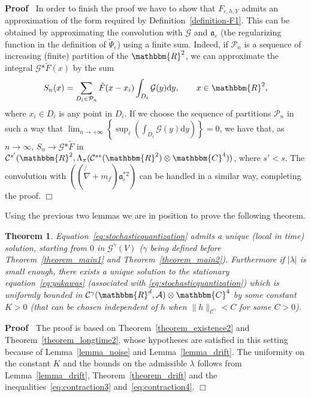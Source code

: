 \documentclass[11pt]{article}
\newcommand{\asterisk}{\mathord{*}}
\newcommand{\mathd}{\mathrm{d}}
\newenvironment{proof}{\noindent\textbf{Proof\ }}{\hspace*{\fill}$\Box$\medskip}
\newtheorem{theorem}{Theorem}
\begin{document}
\begin{proof}
  In order to finish the proof we have to show that $F_{\varepsilon, h, Y}$
  admits an approximation of the form required by
  Definition~\ref{definition-F1}. This can be obtained by approximating the
  convolution with $\mathcal{G}$ and $\mathfrak{a}_{\varepsilon}$ (the
  regularizing function in the definition of $\tilde{\Psi}_{\varepsilon}$)
  using a finite sum. Indeed, if $\mathcal{P}_n$ is a sequence of increasing
  (finite) partition of the $\mathbbm{R}^2$, we can approximate the integral
  $\mathcal{G} \asterisk \tilde{F} (x)$ by the sum
  \[ S_n (x) = \sum_{D_i \in \mathcal{P}_n}  \tilde{F} (x - x_i) \int_{D_i}
     \mathcal{G} (y) \mathd y, \qquad x \in \mathbbm{R}^2, \]
  where $x_i \in D_i$ is any point in $D_i$. If we choose the sequence of
  partitions $\mathcal{P}_n$ in such a way that $\lim_{n \rightarrow + \infty}
  \left\{ \sup_i \left( \int_{D_i} \mathcal{G} (y) \mathd y \right) \right\} =
  0$, we have that, as $n \rightarrow \infty$, $S_n \rightarrow \mathcal{G}
  \asterisk \tilde{F}$ in $\mathcal{C}^{s'} (\mathbbm{R}^2, \Lambda_{\pi}
  (\mathcal{C}^{s \ast} (\mathbbm{R}^2) \otimes \mathbbm{C}^4))$, where $s' <
  s$. The convolution with $\left( \left( \not{\nabla} + m_f \right)
  \mathfrak{a}_{\varepsilon}^{\asterisk 2} \right)$ can be handled in a
  similar way, completing the proof.
\end{proof}

Using the previous two lemmas we are in position to prove the following
theorem.

\begin{theorem}
  \label{theorem_main3}Equation~{\eqref{eq:stochasticquantization}} admits a
  unique (local in time) solution, starting from $0$ in $\mathcal{G}^{\gamma}
  (V)$ ($\gamma$ being defined before Theorem~\ref{theorem_main1} and
  Theorem~\ref{theorem_main2}). Furthermore if $| \lambda |$ is small enough,
  there exists a unique solution to the stationary
  equation~{\eqref{eq:yukawas}} (associated with
  {\eqref{eq:stochasticquantization}}) which is uniformly bounded in
  $\mathcal{C}^{\gamma} (\mathbbm{R}^d, \mathcal{A}) \otimes \mathbbm{C}^4$ by
  some constant $K > 0$ (that can be chosen independent of $h$ when $\| h
  \|_{\mathcal{C}^{\gamma}} < C$ for some $C > 0$).
\end{theorem}

\begin{proof}
  The proof is based on Theorem~\ref{theorem_existence2} and
  Theorem~\ref{theorem_longtime2}, whose hypotheses are satisfied in this
  setting because of Lemma~\ref{lemma_noise} and Lemma~\ref{lemma_drift}. The
  uniformity on the constant $K$ and the bounds on the admissible $\lambda$
  follows from Lemma~\ref{lemma_drift}, Theorem~\ref{theorem_drift} and the
  inequalities~{\eqref{eq:contraction3}} and~{\eqref{eq:contraction4}}.
\end{proof}
\end{document}

